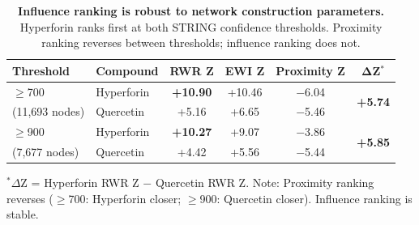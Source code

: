 \begin{table}[ht]
\centering
\caption{\textbf{Influence ranking is robust to network construction parameters.}
Hyperforin ranks first at both STRING confidence thresholds.
Proximity ranking reverses between thresholds; influence ranking does not.}
\label{tab:threshold_robustness}
\vspace{0.5em}
\begin{tabular}{@{}llcccc@{}}
\toprule
\textbf{Threshold} & \textbf{Compound} & \textbf{RWR Z} & \textbf{EWI Z} & \textbf{Proximity Z} & $\boldsymbol{\Delta}$\textbf{Z}$^*$ \\
\midrule
$\geq$700 & Hyperforin & \textbf{+10.90} & +10.46 & $-$6.04 & \multirow{2}{*}{\textbf{+5.74}} \\
(11,693 nodes) & Quercetin & +5.16 & +6.65 & $-$5.46 & \\
\addlinespace
$\geq$900 & Hyperforin & \textbf{+10.27} & +9.07 & $-$3.86 & \multirow{2}{*}{\textbf{+5.85}} \\
(7,677 nodes) & Quercetin & +4.42 & +5.56 & $-$5.44 & \\
\bottomrule
\end{tabular}

\vspace{0.3em}
\begin{minipage}{\linewidth}
\footnotesize
$^*$$\Delta$Z = Hyperforin RWR Z $-$ Quercetin RWR Z. Note: Proximity ranking reverses ($\geq$700: Hyperforin closer; $\geq$900: Quercetin closer). Influence ranking is stable.
\end{minipage}
\end{table}

